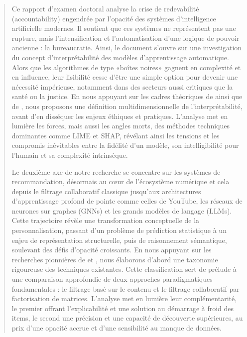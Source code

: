 \begin{quote}
\setlength{\parindent}{1.5em}
Ce rapport d'examen doctoral analyse la crise de redevabilité (accountability)  engendrée par l'opacité des systèmes d'intelligence artificielle modernes. Il soutient que ces systèmes ne représentent pas une rupture, mais l'intensification et l'automatisation d'une logique de pouvoir ancienne : la bureaucratie. Ainsi, le document s'ouvre sur une investigation du concept d'interprétabilité des modèles d'apprentissage automatique. Alors que les algorithmes de type «boîtes noires» \citet{Pasquale2016The} gagnent en complexité et en influence, leur lisibilité cesse d'être une simple option pour devenir une nécessité impérieuse, notamment dans des secteurs aussi critiques que la santé ou la justice. En nous appuyant sur les cadres théoriques de \citet{Doran2002What} ainsi que de \citet{Burkart2021}, nous proposons une définition multidimensionnelle de l'interprétabilité, avant d'en disséquer les enjeux éthiques et pratiques. L'analyse met en lumière les forces, mais aussi les angles morts, des méthodes techniques dominantes comme LIME et SHAP, révélant ainsi les tensions et les compromis inévitables entre la fidélité d'un modèle, son intelligibilité pour l'humain et sa complexité intrinsèque. 

Le deuxième axe de notre recherche se concentre sur les systèmes de recommandation, désormais au cœur de l'écosystème numérique et cela depuis le filtrage collaboratif classique jusqu'aux architectures d'apprentissage profond de pointe comme celles de YouTube, les réseaux de neurones sur graphes (GNNs) et les grands modèles de langage (LLMs). Cette trajectoire révèle une transformation conceptuelle de la personnalisation, passant d'un problème de prédiction statistique à un enjeu de représentation structurelle, puis de raisonnement sémantique, soulevant des défis d'opacité croissants. En nous appuyant sur les recherches pionnières de \citet{Ko2022} et \citet{Koren2011}, nous élaborons d'abord une taxonomie rigoureuse des techniques existantes. Cette classification sert de prélude à une comparaison approfondie de deux approches paradigmatiques fondamentales : le filtrage basé sur le contenu \citet{Pariser2011The} et le filtrage collaboratif par factorisation de matrices. \citet{Koren2009Matrix} L'analyse met en lumière leur complémentarité, le premier offrant l'explicabilité et une solution au démarrage à froid des items, le second une précision et une capacité de découverte supérieures, au prix d'une opacité accrue et d'une sensibilité au manque de données. 


\end{quote}
